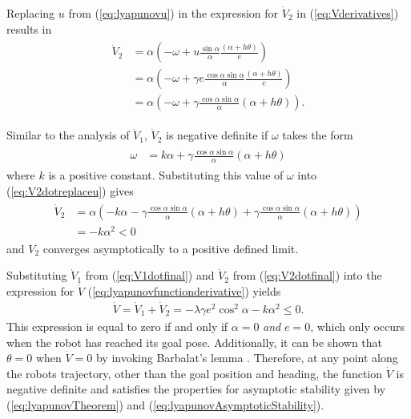 Replacing $u$ from (\ref{eq:lyapunovu}) in the expression for $\dot{V}_2$ in (\ref{eq:Vderivatives}) results in
\begin{align}
\label{eq:V2dotreplaceu}
\begin{split}
\dot{V}_2 &= \alpha\left(-\omega+u\frac{\sin\alpha}{\alpha}\frac{(\alpha+h\theta)}{e}\right) \\
&= \alpha\left(-\omega+\gamma e\frac{\cos\alpha\sin\alpha}{\alpha}\frac{(\alpha+h\theta)}{e}\right) \\
&= \alpha\left(-\omega+\gamma\frac{\cos\alpha\sin\alpha}{\alpha}(\alpha+h\theta)\right).
\end{split}
\end{align}

Similar to the analysis of $\dot{V}_1$, $\dot{V}_2$ is negative definite if $\omega$ takes the form
\begin{align}
\label{eq:lyapunovomega}
\begin{split}
\omega &= k\alpha + \gamma\frac{\cos\alpha\sin\alpha}{\alpha}\left(\alpha+h\theta\right)
\end{split}
\end{align}
where $k$ is a positive constant. Substituting this value of $\omega$ into (\ref{eq:V2dotreplaceu}) gives
\begin{align}
\label{eq:V2dotfinal}
\begin{split}
\dot{V}_2 &= \alpha\left(-k\alpha-\gamma\frac{\cos\alpha\sin\alpha}{\alpha}(\alpha+h\theta) + \gamma\frac{\cos\alpha\sin\alpha}{\alpha}(\alpha+h\theta)\right) \\
&= -k\alpha^2 < 0
\end{split}
\end{align}
and $V_2$ converges asymptotically to a positive defined limit.

Substituting $\dot{V}_1$ from (\ref{eq:V1dotfinal}) and $\dot{V}_2$ from (\ref{eq:V2dotfinal}) into the expression for $\dot{V}$ (\ref{eq:lyapunovfunctionderivative}) yields
\begin{align*}
\dot{V} = \dot{V}_1 + \dot{V}_2 = -\lambda\gamma e^2\cos^2\alpha - k\alpha^2 \leq 0.
\end{align*}
This expression is equal to zero if and only if $\alpha=0$ \textit{and} $e=0$, which only occurs when the robot has reached its goal pose. Additionally, it can be shown that $\theta=0$ when $\dot{V}=0$ by invoking Barbalat's lemma \cite{Aicardi_UnicycleLyapunov95}. Therefore, at any point along the robots trajectory, other than the goal position and heading, the function $\dot{V}$ is negative definite and satisfies the properties for asymptotic stability given by (\ref{eq:lyapunovTheorem}) and (\ref{eq:lyapunovAsymptoticStability}).

